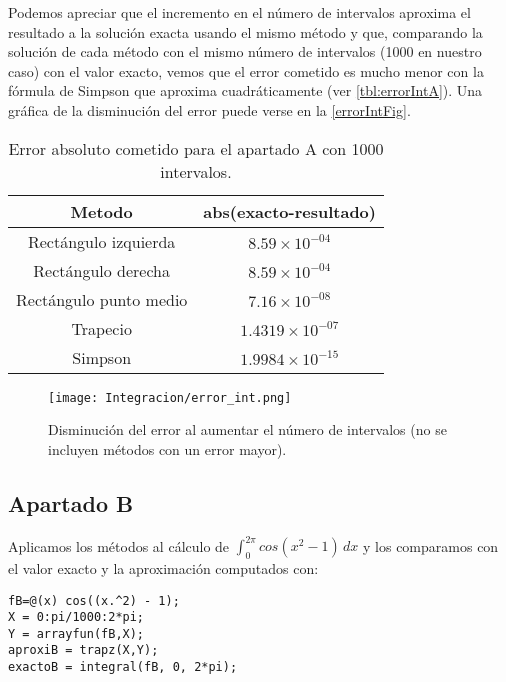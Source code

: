 Podemos apreciar que el incremento en el número de intervalos aproxima el resultado a la solución exacta usando el mismo método y que, comparando la solución de cada método con el mismo número de intervalos (1000 en nuestro caso) con el valor exacto, vemos que el error cometido es mucho menor con la fórmula de Simpson que aproxima cuadráticamente (ver \autoref{tbl:errorIntA}). Una gráfica de la disminución del error puede verse en la \autoref{errorIntFig}.
\begin{table}
\begin{center}
\begin{tabular}{ |c|c| } 
 \hline 
 Metodo & abs(exacto-resultado) \\ 
 \hline \hline
 Rectángulo izquierda &  $8.59\times10^{-04}$ \\ 
 \hline
 Rectángulo derecha &  $8.59\times10^{-04}$ \\ 
 \hline
 Rectángulo punto medio &  $7.16\times10^{-08}$ \\ 
 \hline
 Trapecio &  $1.4319\times10^{-07}$ \\ 
 \hline
 Simpson &  $1.9984\times10^{-15}$ \\ 
 \hline
\end{tabular}
\end{center}
\caption{Error absoluto cometido para el apartado A con 1000 intervalos.}
\label{tbl:errorIntA}
\end{table}

\begin{figure}[!h]
  \centering
  \texttt{[image: Integracion/error\_int.png]}
  \caption{Disminución del error al aumentar el número de intervalos (no se incluyen métodos con un error mayor).}
  \label{errorIntFig}
\end{figure}

\subsection{Apartado B}
Aplicamos los métodos al cálculo de \(\int_{0}^{2\pi} cos(x^2 - 1) \,dx\) y los comparamos con el valor exacto y la aproximación computados con:
\begin{lstlisting}
fB=@(x) cos((x.^2) - 1);
X = 0:pi/1000:2*pi;
Y = arrayfun(fB,X);
aproxiB = trapz(X,Y);
exactoB = integral(fB, 0, 2*pi);
\end{lstlisting}

